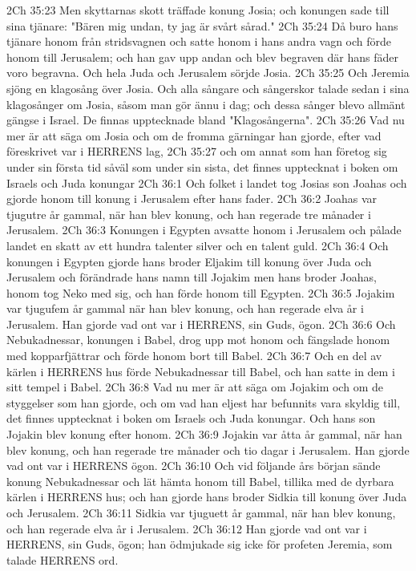 2Ch 35:23  Men skyttarnas skott träffade konung Josia; och konungen sade till sina tjänare: "Bären mig undan, ty jag är svårt sårad."
2Ch 35:24  Då buro hans tjänare honom från stridsvagnen och satte honom i hans andra vagn och förde honom till Jerusalem; och han gav upp andan och blev begraven där hans fäder voro begravna. Och hela Juda och Jerusalem sörjde Josia.
2Ch 35:25  Och Jeremia sjöng en klagosång över Josia. Och alla sångare och sångerskor talade sedan i sina klagosånger om Josia, såsom man gör ännu i dag; och dessa sånger blevo allmänt gängse i Israel. De finnas upptecknade bland "Klagosångerna".
2Ch 35:26  Vad nu mer är att säga om Josia och om de fromma gärningar han gjorde, efter vad föreskrivet var i HERRENS lag,
2Ch 35:27  och om annat som han företog sig under sin första tid såväl som under sin sista, det finnes upptecknat i boken om Israels och Juda konungar
2Ch 36:1  Och folket i landet tog Josias son Joahas och gjorde honom till konung i Jerusalem efter hans fader.
2Ch 36:2  Joahas var tjugutre år gammal, när han blev konung, och han regerade tre månader i Jerusalem.
2Ch 36:3  Konungen i Egypten avsatte honom i Jerusalem och pålade landet en skatt av ett hundra talenter silver och en talent guld.
2Ch 36:4  Och konungen i Egypten gjorde hans broder Eljakim till konung över Juda och Jerusalem och förändrade hans namn till Jojakim men hans broder Joahas, honom tog Neko med sig, och han förde honom till Egypten.
2Ch 36:5  Jojakim var tjugufem år gammal när han blev konung, och han regerade elva år i Jerusalem. Han gjorde vad ont var i HERRENS, sin Guds, ögon.
2Ch 36:6  Och Nebukadnessar, konungen i Babel, drog upp mot honom och fängslade honom med kopparfjättrar och förde honom bort till Babel.
2Ch 36:7  Och en del av kärlen i HERRENS hus förde Nebukadnessar till Babel, och han satte in dem i sitt tempel i Babel.
2Ch 36:8  Vad nu mer är att säga om Jojakim och om de styggelser som han gjorde, och om vad han eljest har befunnits vara skyldig till, det finnes upptecknat i boken om Israels och Juda konungar. Och hans son Jojakin blev konung efter honom.
2Ch 36:9  Jojakin var åtta år gammal, när han blev konung, och han regerade tre månader och tio dagar i Jerusalem. Han gjorde vad ont var i HERRENS ögon.
2Ch 36:10  Och vid följande års början sände konung Nebukadnessar och lät hämta honom till Babel, tillika med de dyrbara kärlen i HERRENS hus; och han gjorde hans broder Sidkia till konung över Juda och Jerusalem.
2Ch 36:11  Sidkia var tjuguett år gammal, när han blev konung, och han regerade elva år i Jerusalem.
2Ch 36:12  Han gjorde vad ont var i HERRENS, sin Guds, ögon; han ödmjukade sig icke för profeten Jeremia, som talade HERRENS ord.

